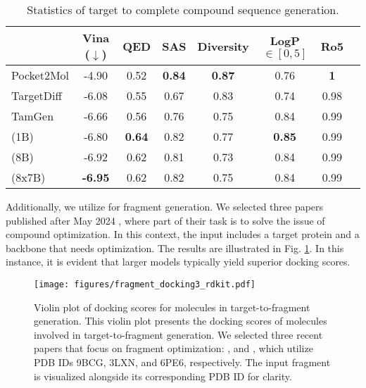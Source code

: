 \begin{table}[!htbp]
\centering
\begin{tabular}{lccccccc}
\toprule
& Vina ($\downarrow$) & QED & SAS & Diversity & LogP$\in[0,5]$ & Ro5  \\
\midrule
Pocket2Mol    & -4.90 & 0.52 & \textbf{0.84} & \textbf{0.87} & 0.76 & \textbf{1}     \\
TargetDiff    & -6.08 & 0.55 & 0.67 & 0.83 & 0.74 & 0.98  \\
TamGen        & -6.66 & 0.56 & 0.76 & 0.75 & 0.84 & 0.99  \\
\ourM{} (1B)  & -6.80 & \textbf{0.64} & 0.82 & 0.77 & \textbf{0.85} & 0.99  \\
\ourM{} (8B)  & -6.92 & 0.62 & 0.81 & 0.73 & 0.84 & 0.99  \\
\ourM{} (8x7B)& \textbf{-6.95} & 0.62 & 0.82 & 0.75 & 0.84 & 0.99 \\
\bottomrule
\end{tabular}
\caption{Statistics of target to complete compound sequence generation.}
\label{tab:tamgen_results}
\end{table}

Additionally, we utilize \ourM{} for fragment generation. We selected three papers published after May 2024 \cite{Tangallapally2024pdb6PE6,Tarr2024pdb9BCG,Mammoliti2024pdb3xln}, where part of their task is to solve the issue of compound optimization. In this context, the input includes a target protein and a backbone that needs optimization. The results are illustrated in Fig. \ref{fig:target_to_frag}. In this instance, it is evident that larger models typically yield superior docking scores.


    


\begin{figure}[!htbp]
\centering
\texttt{[image: figures/fragment\_docking3\_rdkit.pdf]}
\caption{Violin plot of docking scores for molecules in target-to-fragment generation.  This violin plot presents the docking scores of molecules involved in target-to-fragment generation. We selected three recent papers that focus on fragment optimization: \cite{Tarr2024pdb9BCG}, \cite{Mammoliti2024pdb3xln} and \cite{Tangallapally2024pdb6PE6}, which utilize PDB IDs 9BCG, 3LXN, and 6PE6, respectively. The input fragment is visualized alongside its corresponding PDB ID for clarity.}
\label{fig:target_to_frag}
\end{figure}

